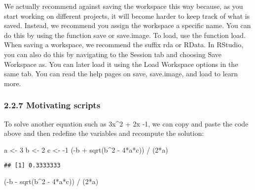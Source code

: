 \documentclass[
]{article}
\newenvironment{Shaded}{\begin{snugshade}}{\end{snugshade}}
\newcommand{\DecValTok}[1]{\textcolor[rgb]{0.00,0.00,0.81}{#1}}
\newcommand{\FunctionTok}[1]{\textcolor[rgb]{0.00,0.00,0.00}{#1}}
\newcommand{\NormalTok}[1]{#1}
\newcommand{\OtherTok}[1]{\textcolor[rgb]{0.56,0.35,0.01}{#1}}
\newcommand{\SpecialCharTok}[1]{\textcolor[rgb]{0.00,0.00,0.00}{#1}}
\begin{document}
We actually recommend against saving the workspace this way because, as
you start working on different projects, it will become harder to keep
track of what is saved. Instead, we recommend you assign the workspace a
specific name. You can do this by using the function save or save.image.
To load, use the function load. When saving a workspace, we recommend
the suffix rda or RData. In RStudio, you can also do this by navigating
to the Session tab and choosing Save Workspace as. You can later load it
using the Load Workspace options in the same tab. You can read the help
pages on save, save.image, and load to learn more.

\hypertarget{motivating-scripts}{%
\subsubsection{2.2.7 Motivating scripts}\label{motivating-scripts}}

To solve another equation such as 3x\^{}2 + 2x -1, we can copy and paste
the code above and then redefine the variables and recompute the
solution:

\begin{Shaded}
\begin{Highlighting}[]
\NormalTok{a }\OtherTok{\textless{}{-}} \DecValTok{3}
\NormalTok{b }\OtherTok{\textless{}{-}} \DecValTok{2}
\NormalTok{c }\OtherTok{\textless{}{-}} \SpecialCharTok{{-}}\DecValTok{1}
\NormalTok{(}\SpecialCharTok{{-}}\NormalTok{b }\SpecialCharTok{+} \FunctionTok{sqrt}\NormalTok{(b}\SpecialCharTok{\^{}}\DecValTok{2} \SpecialCharTok{{-}} \DecValTok{4}\SpecialCharTok{*}\NormalTok{a}\SpecialCharTok{*}\NormalTok{c)) }\SpecialCharTok{/}\NormalTok{ (}\DecValTok{2}\SpecialCharTok{*}\NormalTok{a)}
\end{Highlighting}
\end{Shaded}

\begin{verbatim}
## [1] 0.3333333
\end{verbatim}

\begin{Shaded}
\begin{Highlighting}[]
\NormalTok{(}\SpecialCharTok{{-}}\NormalTok{b }\SpecialCharTok{{-}} \FunctionTok{sqrt}\NormalTok{(b}\SpecialCharTok{\^{}}\DecValTok{2} \SpecialCharTok{{-}} \DecValTok{4}\SpecialCharTok{*}\NormalTok{a}\SpecialCharTok{*}\NormalTok{c)) }\SpecialCharTok{/}\NormalTok{ (}\DecValTok{2}\SpecialCharTok{*}\NormalTok{a)}
\end{Highlighting}
\end{Shaded}
\end{document}
